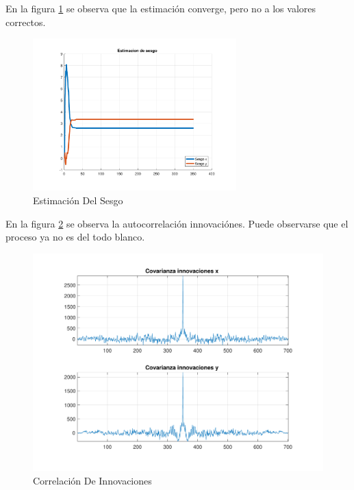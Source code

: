 	En la figura \ref{fig:ej4c_bias} se observa que la estimación converge, pero no a los valores correctos.
	
	\begin{figure}[H]
		\centering
		\includegraphics[width=0.7\textwidth,keepaspectratio]{Figuras/bias_ej4c.pdf}
		\caption{Estimación Del Sesgo}
		\label{fig:ej4c_bias}
	\end{figure}
	
	En la figura \ref{fig:ej4c_cov} se observa la autocorrelación innovaciónes. Puede observarse que el proceso ya no es del todo blanco.
	
	\begin{figure}[H]
		\centering
		\includegraphics[width=1.0\textwidth,keepaspectratio]{Figuras/covinn_ej4c.pdf}
		\caption{Correlación De Innovaciones}
		\label{fig:ej4c_cov}
	\end{figure}
	


